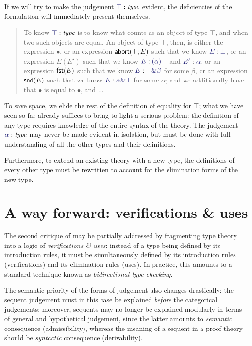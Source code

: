 \documentclass[main.tex]{subfiles}
\begin{document}
If we will try to make the judgement $\type\top$ evident, the deficiencies of
the formulation will immediately present themselves.

\begin{quote}
To know $\type\top$ is to know what counts as an object of type $\top$, and when
two such objects are equal. An object of type $\top$, then, is either the
expression $\bullet$, or an expression $\mathsf{abort}(\top;E)$ such that we know
$\ofty{E}{\bot}$, or an expression $E(E')$ such that we know $\ofty{E}{(\alpha)\top}$ and
$\ofty{E'}{\alpha}$, or an expression $\mathsf{fst}(E)$ such that we know $\ofty{E}{\product\top\beta}$
for some $\beta$, or an expression $\mathsf{snd}(E)$ such that we know
$\ofty{E}{\product\alpha\top}$ for some $\alpha$; and we additionally have that $\bullet$
is equal to $\bullet$, and ...
\end{quote}

To save space, we elide the rest of the definition of equality for $\top$; what
we have seen so far already suffices to bring to light a serious problem: the
definition of any type requires knowledge of the entire syntax of the theory.
The judgement $\type\alpha$ may never be made evident in isolation, but must be
done with full understanding of all the other types and their definitions.

Furthermore, to extend an existing theory with a new type, the definitions of
every other type must be rewritten to account for the elimination forms of the
new type.

\section{A way forward: verifications \& uses}

The second critique of \MLLF{} may be partially addressed by fragmenting type
theory into a logic of \emph{verifications \& uses}: instead of a type being
defined by its introduction rules, it must be simultaneously defined by its
introduction rules (verifications) and its elimination rules (uses). In
practice, this amounts to a standard technique known as \emph{bidirectional
type checking}.

The semantic priority of the forms of judgement also changes drastically: the
sequent judgement must in this case be explained \emph{before} the categorical
judgements; moreover, sequents may no longer be explained modularly in terms of
general and hypothetical judgement, since the latter amounts to
\emph{semantic} consequence (admissibility), whereas the meaning of a sequent
in a proof theory should be \emph{syntactic} consequence (derivability).
\end{document}
